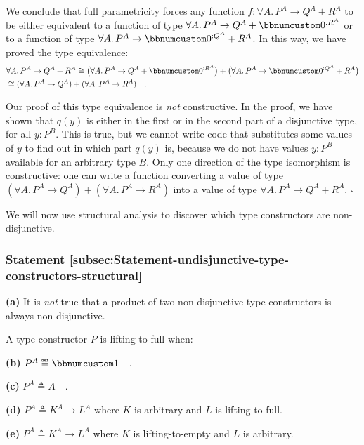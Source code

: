We conclude that full parametricity forces any function $f:\forall A.\,P^{A}\rightarrow Q^{A}+R^{A}$
to be either equivalent to a function of type $\forall A.\,P^{A}\rightarrow Q^{A}+\bbnum 0^{:R^{A}}$
or to a function of type $\forall A.\,P^{A}\rightarrow\bbnum 0^{:Q^{A}}+R^{A}$.
In this way, we have proved the type equivalence:
\begin{align*}
 & \forall A.\,P^{A}\rightarrow Q^{A}+R^{A}\cong\big(\forall A.\,P^{A}\rightarrow Q^{A}+\bbnum 0^{:R^{A}}\big)+\big(\forall A.\,P^{A}\rightarrow\bbnum 0^{:Q^{A}}+R^{A}\big)\\
 & \cong(\forall A.\,P^{A}\rightarrow Q^{A})+(\forall A.\,P^{A}\rightarrow R^{A})\quad.
\end{align*}

Our proof of this type equivalence is \emph{not} constructive. In
the proof, we have shown that $q(y)$ is either in the first or in
the second part of a disjunctive type, for all $y:P^{B}$. This is
true, but we cannot write code that substitutes some values of $y$
to find out in which part $q(y)$ is, because we do not have values
$y:P^{B}$ available for an arbitrary type $B$. Only one direction
of the type isomorphism is constructive: one can write a function
converting a value of type $(\forall A.\,P^{A}\rightarrow Q^{A})+(\forall A.\,P^{A}\rightarrow R^{A})$
into a value of type $\forall A.\,P^{A}\rightarrow Q^{A}+R^{A}$.
$\square$

We will now use structural analysis to discover which type constructors
are non-disjunctive.

\subsubsection{Statement \label{subsec:Statement-undisjunctive-type-constructors-structural}\ref{subsec:Statement-undisjunctive-type-constructors-structural}}

\textbf{(a)} It is \emph{not} true that a product of two non-disjunctive
type constructors is always non-disjunctive.

A type constructor $P$ is lifting-to-full when:

\textbf{(b)} $P^{A}\triangleq\bbnum 1$$\quad$.

\textbf{(c)} $P^{A}\triangleq A$$\quad$.

\textbf{(d)} $P^{A}\triangleq K^{A}\rightarrow L^{A}$ where $K$
is arbitrary and $L$ is lifting-to-full.

\textbf{(e)} $P^{A}\triangleq K^{A}\rightarrow L^{A}$ where $K$
is lifting-to-empty and $L$ is arbitrary.

